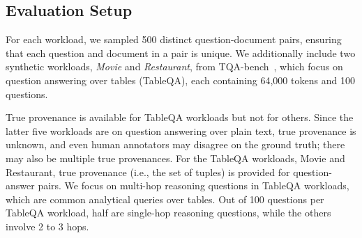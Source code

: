 \subsection{Evaluation Setup}
\label{subsec:eval-setup}

  For each workload, we sampled 500 distinct question-document pairs, ensuring that each question and document in a pair is unique.   
We additionally include two synthetic workloads, {\em Movie} and {\em Restaurant}, from TQA-bench~\cite{wolff2025well}, which focus on question answering over tables (TableQA), each containing  64,000 tokens and 100 questions.   

True provenance is available for TableQA workloads but not for others. Since the latter five workloads are on question answering over plain text, true provenance is unknown, and even human annotators may disagree on the ground truth; there may also be multiple true provenances. 
For the TableQA workloads, Movie and Restaurant, true provenance (i.e., the set of tuples) is provided for question-answer pairs. We focus on multi-hop reasoning questions in TableQA workloads, which are common analytical queries over tables. Out of 100 questions per TableQA workload, half are single-hop reasoning questions, while the others involve 2 to 3 hops.  


